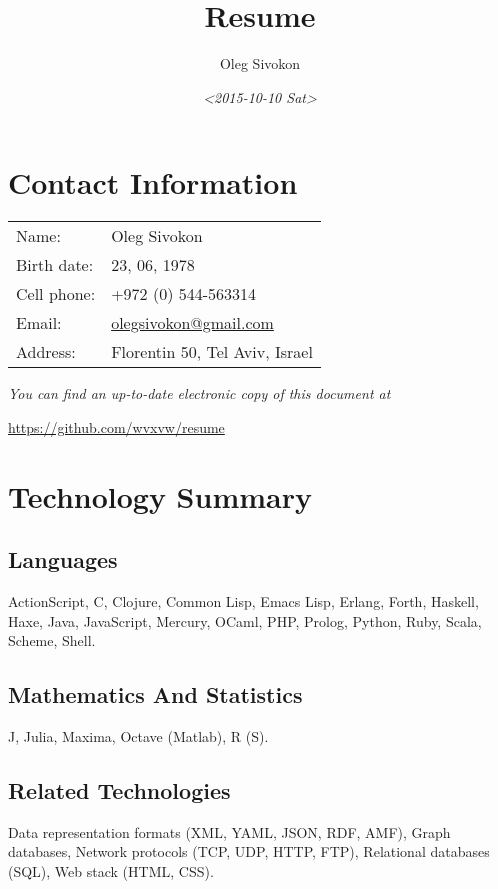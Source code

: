 \documentclass[11pt]{article}
\author{Oleg Sivokon}
\date{\textit{<2015-10-10 Sat>}}
\title{Resume}
\begin{document}
\maketitle

\section{Contact Information}
\label{sec:orgheadline1}
\begin{center}
\begin{tabular}{ll}
Name: & Oleg Sivokon\\
Birth date: & 23, 06, 1978\\
Cell phone: & +972 (0) 544-563314\\
Email: & \href{mailto:olegsivokon@gmail.com}{olegsivokon@gmail.com}\\
Address: & Florentin 50, Tel Aviv, Israel\\
\end{tabular}
\end{center}

\emph{You can find an up-to-date electronic copy of this document at}

\url{https://github.com/wvxvw/resume}

\clearpage

\section{Technology Summary}
\label{sec:orgheadline8}
\subsection{Languages}
\label{sec:orgheadline2}
ActionScript, C, Clojure, Common Lisp, Emacs Lisp, Erlang, Forth, Haskell,
Haxe, Java, JavaScript, Mercury, OCaml, PHP, Prolog, Python, Ruby, Scala,
Scheme, Shell.

\subsection{Mathematics And Statistics}
\label{sec:orgheadline3}
J, Julia, Maxima, Octave (Matlab), R (S).

\subsection{Related Technologies}
\label{sec:orgheadline4}
Data representation formats (XML, YAML, JSON, RDF, AMF), Graph databases,
Network protocols (TCP, UDP, HTTP, FTP), Relational databases (SQL), Web
stack (HTML, CSS).
\end{document}
